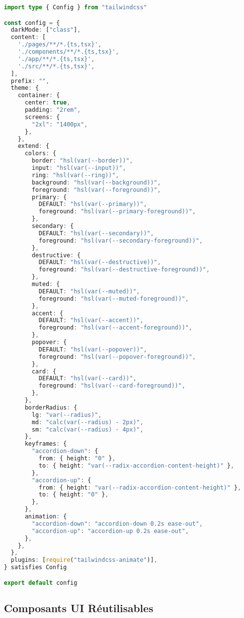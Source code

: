 \begin{lstlisting}[language=TypeScript, caption=Configuration Tailwind (tailwind.config.ts)]
import type { Config } from "tailwindcss"

const config = {
  darkMode: ["class"],
  content: [
    './pages/**/*.{ts,tsx}',
    './components/**/*.{ts,tsx}',
    './app/**/*.{ts,tsx}',
    './src/**/*.{ts,tsx}',
  ],
  prefix: "",
  theme: {
    container: {
      center: true,
      padding: "2rem",
      screens: {
        "2xl": "1400px",
      },
    },
    extend: {
      colors: {
        border: "hsl(var(--border))",
        input: "hsl(var(--input))",
        ring: "hsl(var(--ring))",
        background: "hsl(var(--background))",
        foreground: "hsl(var(--foreground))",
        primary: {
          DEFAULT: "hsl(var(--primary))",
          foreground: "hsl(var(--primary-foreground))",
        },
        secondary: {
          DEFAULT: "hsl(var(--secondary))",
          foreground: "hsl(var(--secondary-foreground))",
        },
        destructive: {
          DEFAULT: "hsl(var(--destructive))",
          foreground: "hsl(var(--destructive-foreground))",
        },
        muted: {
          DEFAULT: "hsl(var(--muted))",
          foreground: "hsl(var(--muted-foreground))",
        },
        accent: {
          DEFAULT: "hsl(var(--accent))",
          foreground: "hsl(var(--accent-foreground))",
        },
        popover: {
          DEFAULT: "hsl(var(--popover))",
          foreground: "hsl(var(--popover-foreground))",
        },
        card: {
          DEFAULT: "hsl(var(--card))",
          foreground: "hsl(var(--card-foreground))",
        },
      },
      borderRadius: {
        lg: "var(--radius)",
        md: "calc(var(--radius) - 2px)",
        sm: "calc(var(--radius) - 4px)",
      },
      keyframes: {
        "accordion-down": {
          from: { height: "0" },
          to: { height: "var(--radix-accordion-content-height)" },
        },
        "accordion-up": {
          from: { height: "var(--radix-accordion-content-height)" },
          to: { height: "0" },
        },
      },
      animation: {
        "accordion-down": "accordion-down 0.2s ease-out",
        "accordion-up": "accordion-up 0.2s ease-out",
      },
    },
  },
  plugins: [require("tailwindcss-animate")],
} satisfies Config

export default config
\end{lstlisting}

\subsection{Composants UI Réutilisables}

